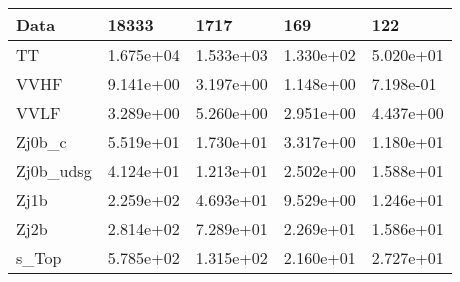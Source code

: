\begin{table}
{\begin{tabularx}{\textwidth}{|X|X|X|X|X|}
\hline
Data & 18333 & 1717 & 169 & 122 \\
\hline
TT & 1.675e+04 & 1.533e+03 & 1.330e+02 & 5.020e+01 \\
VVHF & 9.141e+00 & 3.197e+00 & 1.148e+00 & 7.198e-01 \\
VVLF & 3.289e+00 & 5.260e+00 & 2.951e+00 & 4.437e+00 \\
Zj0b\_c & 5.519e+01 & 1.730e+01 & 3.317e+00 & 1.180e+01 \\
Zj0b\_udsg & 4.124e+01 & 1.213e+01 & 2.502e+00 & 1.588e+01 \\
Zj1b & 2.259e+02 & 4.693e+01 & 9.529e+00 & 1.246e+01 \\
Zj2b & 2.814e+02 & 7.289e+01 & 2.269e+01 & 1.586e+01 \\
s\_Top & 5.785e+02 & 1.315e+02 & 2.160e+01 & 2.727e+01 \\
\hline
\end{tabularx}
}
\label{tab:cr-Zmm-2017}
\end{table}

